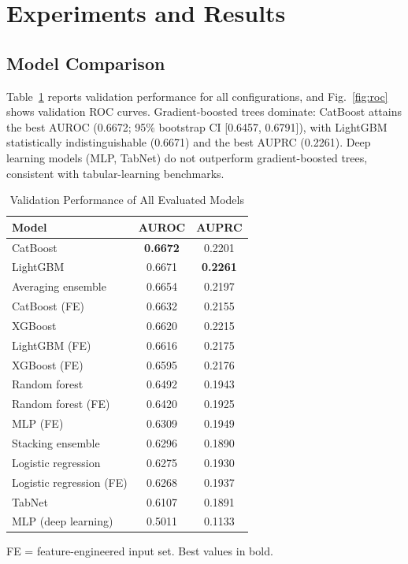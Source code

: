 \documentclass[12pt,onecolumn,journal]{IEEEtran}
\begin{document}
\section{Experiments and Results}
\label{sec:results}

\subsection{Model Comparison}
Table~\ref{tab:models} reports validation performance for all configurations, and Fig.~\ref{fig:roc} shows validation ROC curves. Gradient-boosted trees dominate: CatBoost attains the best AUROC (0.6672; 95\% bootstrap CI [0.6457, 0.6791]), with LightGBM statistically indistinguishable (0.6671) and the best AUPRC (0.2261). Deep learning models (MLP, TabNet) do not outperform gradient-boosted trees, consistent with tabular-learning benchmarks.

\begin{table}[!t]
\centering
\begin{threeparttable}
\caption{Validation Performance of All Evaluated Models}
\label{tab:models}
\begin{tabular}{lcc}
\toprule
\textbf{Model} & \textbf{AUROC} & \textbf{AUPRC} \\
\midrule
CatBoost & \textbf{0.6672} & 0.2201 \\
LightGBM & 0.6671 & \textbf{0.2261} \\
Averaging ensemble & 0.6654 & 0.2197 \\
CatBoost (FE) & 0.6632 & 0.2155 \\
XGBoost & 0.6620 & 0.2215 \\
LightGBM (FE) & 0.6616 & 0.2175 \\
XGBoost (FE) & 0.6595 & 0.2176 \\
Random forest & 0.6492 & 0.1943 \\
Random forest (FE) & 0.6420 & 0.1925 \\
MLP (FE) & 0.6309 & 0.1949 \\
Stacking ensemble & 0.6296 & 0.1890 \\
Logistic regression & 0.6275 & 0.1930 \\
Logistic regression (FE) & 0.6268 & 0.1937 \\
TabNet & 0.6107 & 0.1891 \\
MLP (deep learning) & 0.5011 & 0.1133 \\
\bottomrule
\end{tabular}
\begin{tablenotes}\footnotesize
\item FE = feature-engineered input set. Best values in bold.
\end{tablenotes}
\end{threeparttable}
\end{table}
\end{document}
